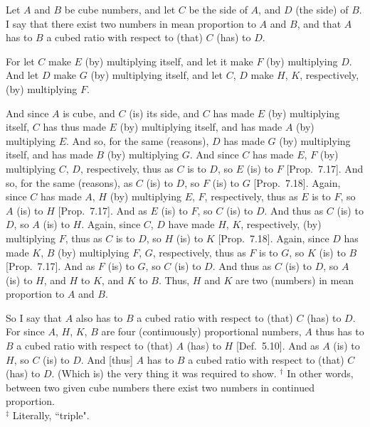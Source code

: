 Let $A$ and $B$ be cube numbers, and let $C$ be the side of $A$, and
$D$ (the side) of $B$. I say that there exist two numbers in mean proportion
to $A$ and $B$, and that $A$ has to $B$ a cubed ratio with respect to (that)
$C$ (has) to $D$.

\centerline{}

For let $C$ make $E$ (by) multiplying itself, and let it make
$F$ (by) multiplying $D$. And let $D$ make $G$ (by) multiplying itself,
and let  $C$, $D$ make  $H$, $K$, respectively, (by) multiplying $F$.

And since $A$ is  cube, and $C$ (is) its side, and $C$ has
made $E$ (by) multiplying itself,  $C$ has thus made $E$ (by) multiplying
itself, and has made $A$ (by) multiplying $E$. And so, for the same (reasons),
$D$ has made $G$ (by) multiplying itself, and has made $B$ (by) multiplying $G$. And since $C$ has made  $E$, $F$ (by)
multiplying $C$, $D$, respectively, thus as $C$ is to $D$, so $E$ (is) to $F$
[Prop.~7.17]. And so, for the same (reasons), 
as $C$ (is) to $D$, so $F$ (is) to $G$ [Prop.~7.18].
Again, since $C$ has made  $A$, $H$ (by) multiplying
 $E$, $F$, respectively, thus as $E$ is to $F$, so $A$ (is) to $H$ [Prop.~7.17].  And as $E$ (is) to $F$, so $C$ (is)
to $D$. And thus as $C$ (is) to $D$, so $A$ (is) to $H$. Again,
since  $C$, $D$ have made  $H$, $K$, respectively,  (by) multiplying
$F$, thus as $C$ is to $D$, so $H$ (is) to $K$  [Prop.~7.18].  Again, since $D$ has made $K$, $B$ (by) multiplying  $F$, $G$, respectively, thus as $F$ is to $G$, so $K$ (is) to $B$ [Prop.~7.17]. And as $F$
(is) to $G$, so $C$ (is) to $D$. And thus as $C$ (is) to $D$, so $A$
(is) to $H$, and $H$ to $K$, and $K$ to $B$. Thus, $H$ and $K$ are two
(numbers) in mean proportion to $A$ and $B$.

So I say that $A$ also has to $B$ a cubed ratio with respect to (that)
$C$ (has) to $D$. For since  $A$, $H$, $K$, $B$ are  four 
(continuously) proportional numbers, $A$ thus has to $B$ a cubed ratio with respect to (that)
$A$ (has) to $H$ [Def.~5.10]. And as $A$ (is) to $H$,
so $C$ (is) to $D$. And [thus] $A$ has to $B$ a cubed ratio
with respect to (that) $C$ (has) to $D$. (Which is) the very thing it was required to show.
{\footnotesize\noindent$^\dag$ In other words, between two given cube numbers there
exist two numbers in continued proportion.\\[0.5ex]
$^\ddag$ Literally, ``triple".}


